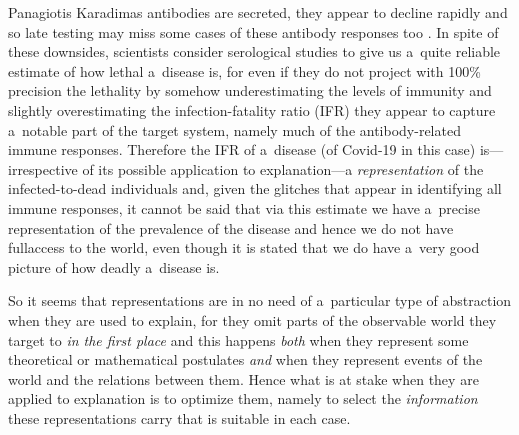 \begin{artengenv}{Panagiotis Karadimas}
antibodies are secreted, they appear to decline rapidly and so late testing may miss some cases of these antibody responses too 
\parencite[][]{burgess_are_2020}. %
 In spite of these downsides, scientists consider serological studies to give us a~quite reliable estimate of how lethal a~disease is, for even if they do not project with 100\% precision the lethality by somehow underestimating the levels of immunity and slightly overestimating the infection-fatality ratio (IFR) they appear to capture a~notable part of the target system, namely much of the antibody-related immune responses. Therefore the IFR of a~disease (of Covid-19 in this case) is---irrespective of its possible application to explanation---a \textit{representation} of the infected-to-dead individuals and, given the glitches that appear in identifying all immune responses, it cannot be said that via this estimate we have a~precise representation of the prevalence of the disease and hence we do not have fullaccess to the world, even though it is stated that we do have a~very good picture of how deadly a~disease is.

So it seems that representations are in no need of a~particular type of abstraction when they are used to explain, for they omit parts of the observable world they target to \textit{in the first place} and this happens \textit{both} when they represent some theoretical or mathematical postulates \textit{and} when they represent events of the world and the relations between them. Hence what is at stake when they are applied to explanation is to optimize them, namely to select the \textit{information} these representations carry that is suitable in each case.


\end{artengenv}
